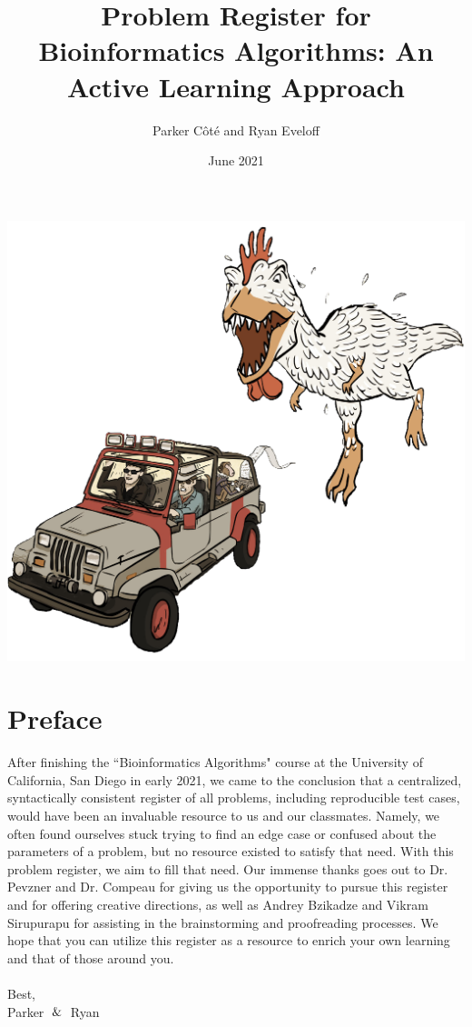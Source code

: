 \documentclass{article}
\title{\large Problem Register for \\ Bioinformatics Algorithms: An Active Learning Approach}
\author{Parker Côté and Ryan Eveloff}
\date{June 2021}
\begin{document}
\maketitle
\begin{center}
    \includegraphics[scale=0.25]{c0/c0_transparent.png}
\end{center}
\pagebreak

\section*{Preface}
After finishing the ``Bioinformatics Algorithms" course at the University of California, San Diego in early 2021, we came to the conclusion that a centralized, syntactically consistent register of all problems, including reproducible test cases, would have been an invaluable resource to us and our classmates. Namely, we often found ourselves stuck trying to find an edge case or confused about the parameters of a problem, but no resource existed to satisfy that need. With this problem register, we aim to fill that need. Our immense thanks goes out to Dr. Pevzner and Dr. Compeau for giving us the opportunity to pursue this register and for offering creative directions, as well as Andrey Bzikadze and Vikram Sirupurapu for assisting in the brainstorming and proofreading processes. We hope that you can utilize this register as a resource to enrich your own learning and that of those around you. \\ \\
\noindent Best, \\
\noindent Parker $\And$ Ryan
\end{document}
